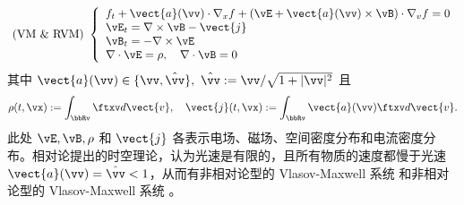 \begin{equation}\label{eq:vm}\text { (VM \& RVM) }\left\{\begin{array}{l}
    f_{t}+\vect{a}(\vv) \cdot \nabla_{x} f+(\vE+\vect{a}(\vv) \times \vB) \cdot \nabla_{v} f=0 \\
    \vE_{t}=\nabla \times \vB-\vect{j} \\
    \vB_{t}=-\nabla \times \vE \\
    \nabla \cdot \vE=\rho, \quad \nabla \cdot \vB=0
    \end{array}\right.\end{equation}
其中 $\vect{a}(\vv) \in\{\vv, \hat{\vv}\},~ \hat{\vv}:=\vv / \sqrt{1+|\vv|^{2}}$ 且 
\begin{equation}
\rho(t, \vx):=\int_{\bbRv} \ftxv d \vect{v}, \quad \vect{j}(t, \vx):=\int_{\bbRv} \vect{a}(\vv)\ftxv d \vect{v}.
\end{equation}
此处 $\vE, \vB, \rho$ 和 $\vect{j}$ 各表示电场、磁场、空间密度分布和电流密度分布。相对论提出的时空理论，认为光速是有限的，且所有物质的速度都慢于光速 $\vect{a}(\vv)=\hat{\vv}< 1$，从而有非相对论型的 Vlasov-Maxwell 系统 \eqvm 和非相对论型的 Vlasov-Maxwell 系统 \eqrvm。



